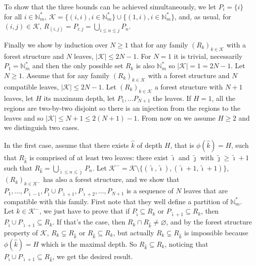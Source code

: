 \documentclass[
  11pt,
  a4paper,
]{article}
\theoremstyle{plain}
\theoremstyle{definition}
\theoremstyle{plain}
\theoremstyle{definition}
\theoremstyle{plain}
\theoremstyle{remark}
\begin{document}
To show that the three bounds can be achieved simultaneously, we let
\(P_i=\{i\}\) for all \(i\in\mathbb{N}_m^*\),
\(\mathcal{K}=\{(i,i), i\in\mathbb{N}_m^*\}\cup\{(1,i), i\in\mathbb{N}_m^*\}\),
and, as usual, for \((i,j)\in\mathcal{K}\),
\(R_{(i,j)}=P_{i:j}=\bigcup_{i\leq n\leq j}P_n\).

Finally we show by induction over \(N\geq1\) that for any family
\((R_k)_{k\in\mathcal{K}}\) with a forest structure and \(N\) leaves,
\(|\mathcal{K}|\leq 2N-1\). For \(N=1\) it is trivial, necessarily
\(P_1=\mathbb{N}_m^*\) and then the only possible set \(R_k\) is also
\(\mathbb{N}_m^*\) so \(|\mathcal{K}|=1=2N-1\). Let \(N\geq 1\). Assume
that for any family \((R_k)_{k\in\mathcal{K}}\) with a forest structure
and \(N\) compatible leaves, \(|\mathcal{K}|\leq 2N-1\). Let
\((R_k)_{k\in\mathcal{K}}\) a forest structure with \(N+1\) leaves, let
\(H\) its maximum depth, let \(P_1, \dotsc P_{N+1}\) the leaves. If
\(H=1\), all the regions are two-by-two disjoint so there is an
injection from the regions to the leaves and so
\(|\mathcal{K}|\leq N+1\leq 2(N+1)-1\). From now on we assume \(H\geq2\)
and we distinguish two cases.

In the first case, assume that there exists \(\hat k\) of depth \(H\),
that is \(\phi(\hat k)=H\), such that \(R_{\hat k}\) is comprised of at
least two leaves: there exist \(\tilde\imath\) and \(\tilde\jmath\) with
\(\tilde\jmath\geq\tilde\imath+1\) such that
\(R_{\hat k}=\bigcup_{\tilde\imath\leq n\leq \tilde\jmath}P_n\). Let
\(\mathcal{K}^-=\mathcal{K}\setminus\{(\tilde\imath, \tilde\imath), (\tilde\imath+1, \tilde\imath+1)\}\),
\((R_k)_{k\in\mathcal{K}^-}\) has also a forest structure, and we show
that
\(P_1,\dotsc,P_{\tilde\imath-1}, P_{\tilde\imath}\cup P_{\tilde\imath+1},P_{\tilde\imath+2},\dotsc,P_{N+1}\)
is a sequence of \(N\) leaves that are compatible with this family.
First note that they well define a partition of \(\mathbb{N}_m^*\). Let
\(k\in\mathcal{K}^-\), we just have to prove that if
\(P_{\tilde\imath}\subseteq R_k\) or
\(P_{\tilde\imath+1}\subseteq R_k\), then
\(P_{\tilde\imath}\cup P_{\tilde\imath+1}\subseteq R_k\). If that's the
case, then \(R_k\cap R_{\hat k}\neq\varnothing\), and by the forest
structure property of \(\mathcal{K}\), \(R_k\subsetneq R_{\hat k}\) or
\(R_{\hat k}\subseteq R_k\), but actually \(R_k\subsetneq R_{\hat k}\)
is impossible because \(\phi(\hat k)=H\) which is the maximal depth. So
\(R_{\hat k}\subseteq R_k\), noticing that
\(P_{\tilde\imath}\cup P_{\tilde\imath+1}\subseteq R_{\hat k}\), we get
the desired result.
\end{document}
